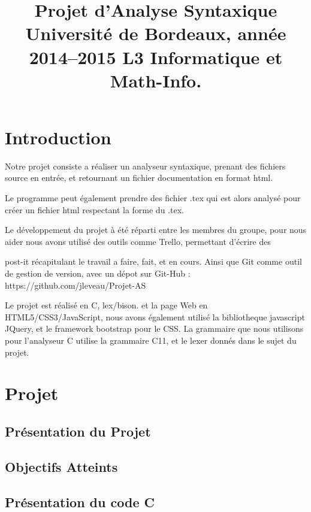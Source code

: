 \documentclass{report}
\title{Projet d’Analyse Syntaxique Université de Bordeaux, année 2014–2015 L3 Informatique et Math-Info.}
\begin{document}
\maketitle
\tableofcontents
\part{Introduction}
Notre projet consiste a réaliser un analyseur syntaxique, prenant des fichiers source en entrée, et retournant un fichier documentation en format html.

Le programme peut également prendre des fichier .tex qui est alors analysé pour créer un fichier html respectant la forme du .tex.

Le développement du projet à été réparti entre les membres du groupe, pour nous aider nous avons utilisé des outils comme Trello, permettant d'écrire des 

post-it récapitulant le travail a faire, fait, et en cours. Ainsi que Git comme outil de gestion de version, avec un dépot sur Git-Hub : https://github.com/jleveau/Projet-AS

Le projet est réalisé en C, lex/bison. et la page Web en HTML5/CSS3/JavaScript, nous avons également utilisé la bibliotheque javascript JQuery, et le framework bootstrap pour le CSS. La grammaire que nous utilisons pour l'analyseur C utilise la grammaire C11, et le lexer donnés dans le sujet du projet.
\part{Projet}
\chapter{Présentation du Projet}
\chapter{Objectifs Atteints}
\chapter{Présentation du code C}
\end{document}
